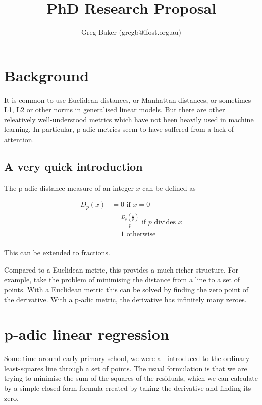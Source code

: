 \documentclass[a4paper,twocolumn, 10pt]{article}
\title{PhD Research Proposal}
\author{Greg Baker (gregb@ifost.org.au)}
\begin{document}
\maketitle
\tableofcontents
\listoffigures

\section{Background}

It is common to use Euclidean distances, or Manhattan distances, or
sometimes L1, L2 or other norms in generalised linear models. But
there are other releatively well-understood metrics which have not
been heavily used in machine learning. In particular, p-adic metrics
seem to have suffered from a lack of attention.


\subsection{A very quick introduction}

The p-adic distance measure of an integer $x$ can be
defined as

\begin{align*}
 D_p(x) &= 0   \text{ if } x = 0 \\
      &= \frac{D_p(\frac{x}{p})}{p}   \text{ if } p \text{ divides } x \\
      &= 1 \text{ otherwise} \\
\end{align*}

This can be extended to fractions.

Compared to a Euclidean metric, this provides a much richer structure.
For example, take the problem of minimising the distance from a line to
a set of points. With a Euclidean metric this can be solved by finding the
zero point of the derivative. With a p-adic metric, the derivative has
infinitely many zeroes.

\section{p-adic linear regression}\label{plr}

Some time around early primary school, we were all introduced to the
ordinary-least-squares line through a set of points. The usual formulation
is that we are trying to minimise the sum of the squares of the residuals,
which we can calculate by a simple closed-form formula created
by taking the derivative and finding its zero.
\end{document}
